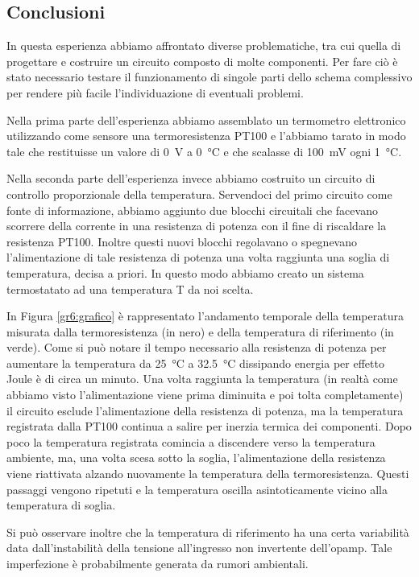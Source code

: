 \subsection*{Conclusioni}

In questa esperienza abbiamo affrontato diverse problematiche, tra cui quella di progettare e costruire un circuito composto di molte componenti.
Per fare ciò è stato necessario testare il funzionamento di singole parti dello schema complessivo per rendere più facile l'individuazione di eventuali problemi.

Nella prima parte dell'esperienza abbiamo assemblato un termometro elettronico utilizzando come sensore una termoresistenza PT100 e l'abbiamo tarato in modo tale che restituisse un valore di \SI{0}{\V} a \SI{0}{\celsius} e che scalasse di \SI{100}{\mV} ogni \SI{1}{\celsius}.

Nella seconda parte dell'esperienza invece abbiamo costruito un circuito di controllo proporzionale della temperatura.
Servendoci del primo circuito come fonte di informazione, abbiamo aggiunto due blocchi circuitali che facevano scorrere della corrente in una resistenza di potenza con il fine di riscaldare la resistenza PT100.
Inoltre questi nuovi blocchi regolavano o spegnevano l'alimentazione di tale resistenza di potenza una volta raggiunta una soglia di temperatura, decisa a priori.
In questo modo abbiamo creato un sistema termostatato ad una temperatura T da noi scelta.

In Figura \ref{gr6:grafico} è rappresentato l'andamento temporale della temperatura misurata dalla termoresistenza (in nero) e della temperatura di riferimento (in verde).
Come si può notare il tempo necessario alla resistenza di potenza per aumentare la temperatura da \SI{25}{\celsius} a \SI{32.5}{\celsius} dissipando energia per effetto Joule è di circa un minuto.
Una volta raggiunta la temperatura (in realtà come abbiamo visto l'alimentazione viene prima diminuita e poi tolta completamente) il circuito esclude l'alimentazione della resistenza di potenza, ma la temperatura registrata dalla PT100 continua a salire per inerzia termica dei componenti.
Dopo poco la temperatura registrata comincia a discendere verso la temperatura ambiente, ma, una volta scesa sotto la soglia, l'alimentazione della resistenza viene riattivata alzando nuovamente la temperatura della termoresistenza.
Questi passaggi vengono ripetuti e la temperatura oscilla asintoticamente vicino alla temperatura di soglia.

Si può osservare inoltre che la temperatura di riferimento ha una certa variabilità data dall'instabilità della tensione all'ingresso non invertente dell'opamp. Tale imperfezione è probabilmente generata da rumori ambientali.
